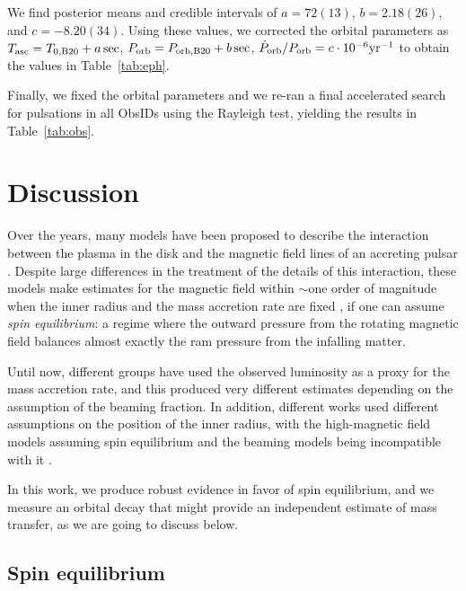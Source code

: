 \documentclass[twocolumn]{aastex631}
\newcommand{\Porbdot}{\ensuremath{\dot{P}_{\rm orb}}}
\newcommand{\Porb}{\ensuremath{P_{\rm orb}}}
\newcommand{\tasc}{\ensuremath{T_{\rm asc}{}}}
\newcommand{\msix}{\ensuremath{10^{-6}}\xspace}
\newcommand{\tabref}{Table~\ref}
\begin{document}
We find posterior means and credible intervals of $a=72(13)$, $b=2.18(26)$, and $c=-8.20(34)$. Using these values, we corrected the orbital parameters as $\tasc=T_{0,\rm B20} + a\,\mathrm{sec}$, $\Porb=P_{\rm orb,B20} + b\,\mathrm{sec}$, $\Porbdot/\Porb=c\cdot\msix {\rm yr}^{-1}$ to obtain the values in Table~\ref{tab:eph}.

Finally, we fixed the orbital parameters and we re-ran a final accelerated search for pulsations in all ObsIDs using the Rayleigh test, yielding the results in \tabref{tab:obs}.

\section{Discussion}

Over the years, many models have been proposed to describe the interaction between the plasma in the disk and the magnetic field lines of an accreting pulsar \citep{ghoshDiskAccretionMagnetic1978,wangLocationInnerRadius1996,chashkina2017}.
Despite large differences in the treatment of the details of this interaction, these models make estimates for the magnetic field within $\sim$one order of magnitude when the inner radius and the mass accretion rate are fixed \citep{xuMagneticFieldUltraluminous2017,chenStudyingMagneticFields2021,erkutMagneticFieldsBeaming2020}, if one can assume \textit{spin equilibrium}: a regime where the outward pressure from the rotating magnetic field balances almost exactly the ram pressure from the infalling matter.

Until now, different groups have used the observed luminosity as a proxy for the mass accretion rate, and this produced very different estimates depending on the assumption of the beaming fraction.
In addition, different works used different assumptions on the position of the inner radius, with the high-magnetic field models assuming spin equilibrium \citep{eksiUltraluminousXraySource2015,tsygankovPropellerEffectAction2016,dallossoNuSTARJ09555169402015} and the beaming models being incompatible with it \citep{kingPulsingULXsTip2017}.

In this work, we produce robust evidence in favor of spin equilibrium, and we measure an orbital decay that might provide an independent estimate of mass transfer, as we are going to discuss below.

\subsection{Spin equilibrium}\label{sec:equilibrium}
\end{document}
